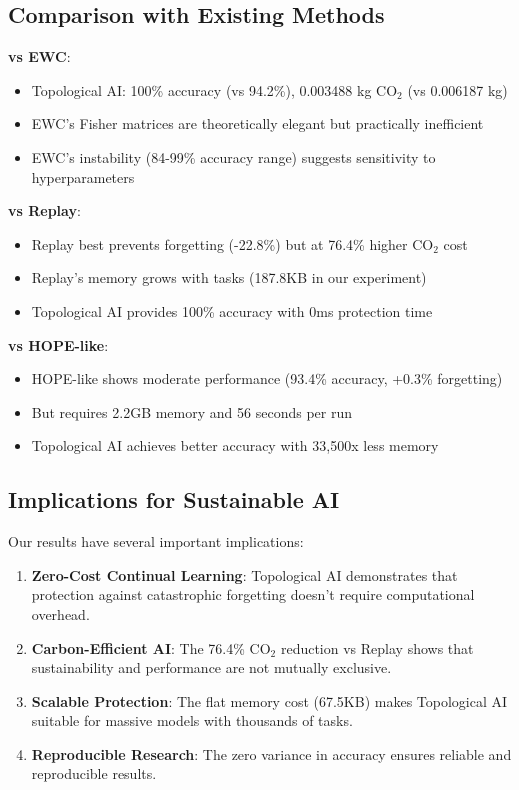 \documentclass{article}
\begin{document}
\subsection{Comparison with Existing Methods}

\textbf{vs EWC}:
\begin{itemize}
\item Topological AI: 100\% accuracy (vs 94.2\%), 0.003488 kg CO$_2$ (vs 0.006187 kg)
\item EWC's Fisher matrices are theoretically elegant but practically inefficient
\item EWC's instability (84-99\% accuracy range) suggests sensitivity to hyperparameters
\end{itemize}

\textbf{vs Replay}:
\begin{itemize}
\item Replay best prevents forgetting (-22.8\%) but at 76.4\% higher CO$_2$ cost
\item Replay's memory grows with tasks (187.8KB in our experiment)
\item Topological AI provides 100\% accuracy with 0ms protection time
\end{itemize}

\textbf{vs HOPE-like}:
\begin{itemize}
\item HOPE-like shows moderate performance (93.4\% accuracy, +0.3\% forgetting)
\item But requires 2.2GB memory and 56 seconds per run
\item Topological AI achieves better accuracy with 33,500x less memory
\end{itemize}

\subsection{Implications for Sustainable AI}

Our results have several important implications:

\begin{enumerate}
\item \textbf{Zero-Cost Continual Learning}: Topological AI demonstrates that protection against catastrophic forgetting doesn't require computational overhead.

\item \textbf{Carbon-Efficient AI}: The 76.4\% CO$_2$ reduction vs Replay shows that sustainability and performance are not mutually exclusive.

\item \textbf{Scalable Protection}: The flat memory cost (67.5KB) makes Topological AI suitable for massive models with thousands of tasks.

\item \textbf{Reproducible Research}: The zero variance in accuracy ensures reliable and reproducible results.
\end{enumerate}
\end{document}
